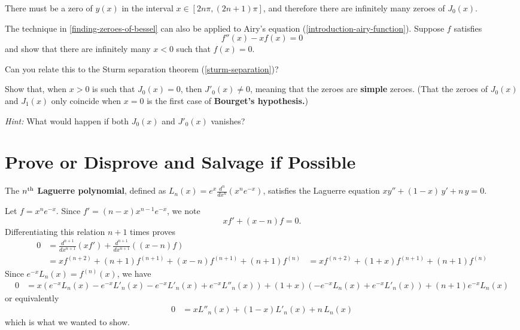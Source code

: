 \documentclass{homework}
\begin{document}
\begin{solution}
  There must be a zero of $y(x)$ in the interval $x \in [2 n \pi, (2n+1) \pi]$, and therefore there are infinitely many zeroes of $J_0(x)$.
\end{solution}

\begin{problem}The technique in \ref{finding-zeroes-of-bessel} can also be applied to Airy's equation (\ref{introduction-airy-function}).  Suppose $f$ satisfies
  \[
    f''(x) - x f(x) = 0
  \]
  and show that there are infinitely many $x < 0$ such that
  $f(x) = 0$.

  Can you relate this to the Sturm separation theorem
  (\ref{sturm-separation})?
\end{problem}

\begin{problem}
  Show that, when $x > 0$ is such that $J_0(x) = 0$, then
  $J'_0(x) \neq 0$, meaning that the zeroes are \textbf{simple}
  zeroes.  (That the zeroes of $J_0(x)$ and $J_1(x)$ only coincide when
  $x=0$ is the first case of \textbf{Bourget's hypothesis.})

  \textit{Hint:} What would happen if both $J_0(x)$ and $J'_0(x)$
  vanishes?
\end{problem}

\section{Prove or Disprove and Salvage if Possible}

\begin{problem}
  The $n^{\mbox{\scriptsize th}}$ \textbf{Laguerre polynomial}, defined as
  \(L_n(x) = e^x \displaystyle\frac{d^n}{dx^n} (x^n e^{-x})\),
  satisfies the Laguerre equation \(x y'' + (1-x) \, y' + n \, y = 0\).
\end{problem}

\begin{solution}
  Let $f = x^n e^{-x}$.  Since $f' = (n-x) x^{n-1} e^{-x}$, we note
  \[
    x f' + (x-n) f  = 0.
  \]
  Differentiating this relation $n+1$ times proves
  \begin{align*}
    0 &= \frac{d^{n+1}}{dx^{n+1}} (x f') + \frac{d^{n+1}}{dx^{n+1}} ((x-n) f) \\
      &= x f^{(n+2)} + (n+1) f^{(n+1)} + ( x - n ) f^{(n+1)} + (n+1) f^{(n)}
      &= x f^{(n+2)} + (1+x) f^{(n+1)} + (n+1) f^{(n)}
  \end{align*}
  Since $e^{-x} L_n(x) = f^{(n)}(x)$, we have
  \begin{align*}
    0 &= x \left( e^{-x} L_n(x) - e^{-x} L'_n(x) - e^{-x} L'_n(x) + e^{-x} L''_n(x)  \right) + (1+x) \left( - e^{-x} L_n(x) + e^{-x} L'_n(x) \right)  + (n+1) e^{-x} L_n(x)
  \end{align*}
  or equivalently
  \begin{align*}
    0 &= x  L''_n(x)  + (1-x) L'_n(x)  + n \, L_n(x)
  \end{align*}
  which is what we wanted to show.
\end{solution}
\end{document}
